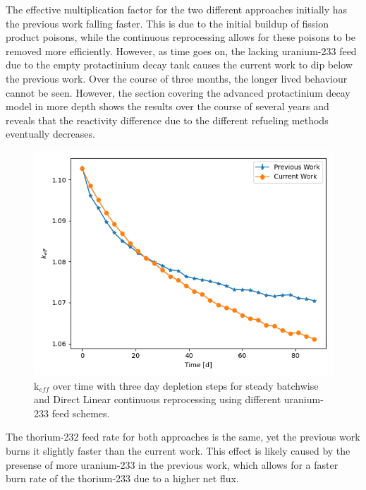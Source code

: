 The effective multiplication factor for the two different approaches initially has the previous work falling faster. This is due to the initial buildup of fission product poisons, while the continuous reprocessing allows for these poisons to be removed more efficiently. However, as time goes on, the lacking uranium-233 feed due to the empty protactinium decay tank causes the current work to dip below the previous work. Over the course of three months, the longer lived behaviour cannot be seen. However, the section covering the advanced protactinium decay model in more depth shows the results over the course of several years and reveals that the reactivity difference due to the different refueling methods eventually decreases.

\begin{figure}[H]
  \centering
  \includegraphics[scale=0.7]{images/prev-cur-keff.png}
  \caption{k$_{eff}$ over time with three day depletion steps for steady batchwise and Direct Linear continuous reprocessing using different uranium-233 feed schemes.}
   \label{fig:prev-cur-keff-plot}
\end{figure}

The thorium-232 feed rate for both approaches is the same, yet the previous work burns it slightly faster than the current work. This effect is likely caused by the presense of more uranium-233 in the previous work, which allows for a faster burn rate of the thorium-233 due to a higher net flux.

